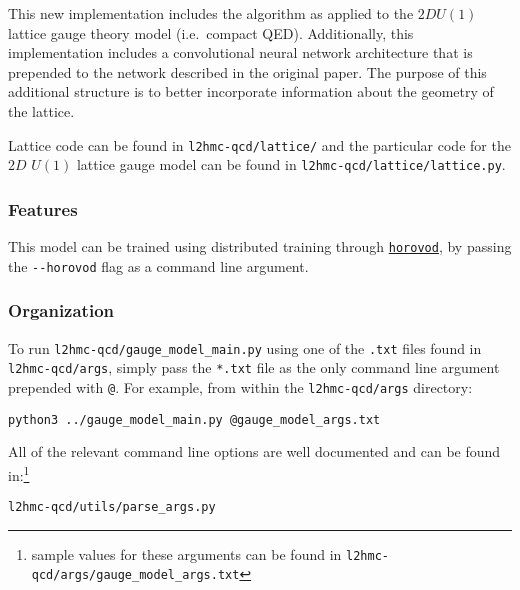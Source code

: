 \vspace{10px}
\noindent
This new implementation includes the algorithm as applied to the $2D
 U{(1)}$ lattice gauge theory model (i.e.~compact QED).
%
\vspace{10px}
\noindent
Additionally, this implementation includes a convolutional neural
network architecture that is prepended to the network described in the
original paper. The purpose of this additional structure is to better
incorporate information about the geometry of the lattice.

\vspace{10px}
\noindent
Lattice code can be found in \texttt{l2hmc-qcd/lattice/} and the
particular code for the $2D$ $U{(1)}$ lattice gauge model can be
found in \texttt{l2hmc-qcd/lattice/lattice.py}.

\hypertarget{features}{%
\subsubsection{Features}\label{features}}
%
This model can be trained using distributed training through
\href{https://github.com/horovod/horovod}{\texttt{horovod}}, by passing
the \texttt{-\/-horovod} flag as a command line argument.

\hypertarget{organization}{%
\subsubsection{Organization}\label{organization}}


To run \texttt{l2hmc-qcd/gauge\_model\_main.py} using one of the
\texttt{.txt} files found in \texttt{l2hmc-qcd/args}, simply pass the
\texttt{*.txt} file as the only command line argument prepended with
\texttt{@}.
%
For example, from within the \texttt{l2hmc-qcd/args} directory:

\texttt{python3 ../gauge\_model\_main.py @gauge\_model\_args.txt}

\vspace{10px}
\noindent
All of the relevant command line options are well documented and can be
found in:\footnote{sample values for these arguments can be found in
\texttt{l2hmc-qcd/args/gauge\_model\_args.txt}}

\texttt{l2hmc-qcd/utils/parse\_args.py}

